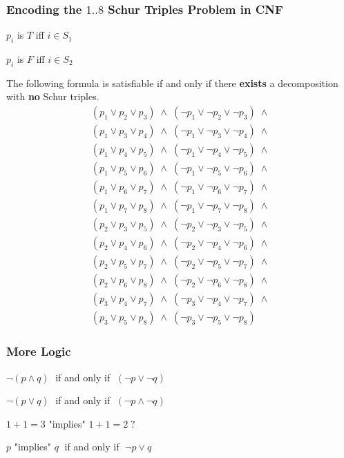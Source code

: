 \documentclass{beamer}
\begin{document}
\begin{frame}
\frametitle{Encoding the $1..8$ Schur Triples Problem in CNF}

$p_i$ is $T$ iff $i\in S_1$

$p_i$ is $F$ iff $i\in S_2$

\pause 
The following formula is satisfiable if and only if there \textbf{\Large exists} a decomposition with \textbf{\Large no} Schur triples.
\[
\begin{array}{l}
(p_1 \vee p_2 \vee p_3) \;\wedge\; (\neg p_1 \vee \neg p_2 \vee \neg p_3) \;\wedge \\
(p_1 \vee p_3 \vee p_4) \;\wedge\; (\neg p_1 \vee \neg p_3 \vee \neg p_4) \;\wedge \\
(p_1 \vee p_4 \vee p_5) \;\wedge\; (\neg p_1 \vee \neg p_4 \vee \neg p_5) \;\wedge \\
(p_1 \vee p_5 \vee p_6) \;\wedge\; (\neg p_1 \vee \neg p_5 \vee \neg p_6) \;\wedge \\
(p_1 \vee p_6 \vee p_7) \;\wedge\; (\neg p_1 \vee \neg p_6 \vee \neg p_7) \;\wedge \\
(p_1 \vee p_7 \vee p_8) \;\wedge\; (\neg p_1 \vee \neg p_7 \vee \neg p_8) \;\wedge \\
(p_2 \vee p_3 \vee p_5) \;\wedge\; (\neg p_2 \vee \neg p_3 \vee \neg p_5) \;\wedge \\
(p_2 \vee p_4 \vee p_6) \;\wedge\; (\neg p_2 \vee \neg p_4 \vee \neg p_6) \;\wedge \\
(p_2 \vee p_5 \vee p_7) \;\wedge\; (\neg p_2 \vee \neg p_5 \vee \neg p_7) \;\wedge \\
(p_2 \vee p_6 \vee p_8) \;\wedge\; (\neg p_2 \vee \neg p_6 \vee \neg p_8) \;\wedge \\
(p_3 \vee p_4 \vee p_7) \;\wedge\; (\neg p_3 \vee \neg p_4 \vee \neg p_7) \;\wedge \\
(p_3 \vee p_5 \vee p_8) \;\wedge\; (\neg p_3 \vee \neg p_5 \vee \neg p_8)
\end{array}\label{eq.schur2}
\]
\end{frame}


\begin{frame}
\frametitle{More Logic}

\begin{center}
$\neg(p \wedge q)\;$ if and only if $\; (\neg p \vee \neg q)$ 

\medskip

$\neg(p \vee q) \;$ if and only if $\; (\neg p \wedge \neg q)$

\pause

\bigskip
\bigskip


$1+1=3$ "implies" $1+1=2\;?$

\pause

\bigskip
\bigskip

$p $ "implies" $ q\;$ if and only if $\;\neg p \vee q$


\end{center}
\end{frame}
\end{document}
